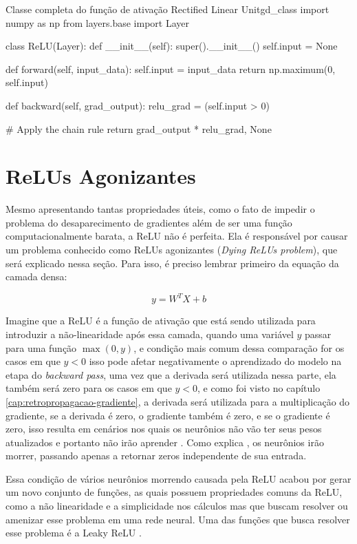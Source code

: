 \begin{codelisting}{Classe completa do função de ativação Rectified Linear Unit}{gd_class}
import numpy as np
from layers.base import Layer

class ReLU(Layer):
    def __init__(self):
        super().__init__()
        self.input = None

    def forward(self, input_data):
        self.input = input_data
        return np.maximum(0, self.input)

    def backward(self, grad_output):
        relu_grad = (self.input > 0)

        # Apply the chain rule
        return grad_output * relu_grad, None
\end{codelisting}

\section{ReLUs Agonizantes}

Mesmo apresentando tantas propriedades úteis, como o fato de impedir o problema do desaparecimento de gradientes além de ser uma função computacionalmente barata, a ReLU não é perfeita. Ela é responsável por causar um problema conhecido como ReLUs agonizantes (\textit{Dying ReLUs problem}), que será explicado nessa seção. Para isso, é preciso lembrar primeiro da equação da camada densa:

\[
    y = W^T  X + b
\]

Imagine que a ReLU é a função de ativação que está sendo utilizada para introduzir a não-linearidade após essa camada, quando uma variável $y$ passar para uma função $\max(0, y)$, e condição mais comum dessa comparação for os casos em que $y < 0$ isso pode afetar negativamente o aprendizado do modelo na etapa do \textit{backward pass}, uma vez que a derivada será utilizada nessa parte, ela também será zero para os casos em que $y < 0$, e como foi visto no capítulo \ref{cap:retropropagacao-gradiente}, a derivada será utilizada para a multiplicação do gradiente, se a derivada é zero, o gradiente também é zero, e se o gradiente é zero, isso resulta em cenários nos quais os neurônios não vão ter seus pesos atualizados e portanto não irão aprender \parencite{DyingReluDouglas}. Como explica \textcite{DyingReluDouglas}, os neurônios irão morrer, passando apenas a retornar zeros independente de sua entrada.

Essa condição de vários neurônios morrendo causada pela ReLU acabou por gerar um novo conjunto de funções, as quais possuem propriedades comuns da ReLU, como a não linearidade e a simplicidade nos cálculos mas que buscam resolver ou amenizar esse problema em uma rede neural. Uma das funções que busca resolver esse problema é a Leaky ReLU \parencite{DyingReluDouglas}.


